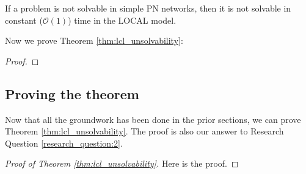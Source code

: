 \begin{lemma} \label{lem:lcl_unsolvability:5}
    If a problem is not solvable in simple PN networks, then it is not solvable in constant ($\mathcal{O}(1)$) time in the LOCAL model.
\end{lemma}

Now we prove Theorem \ref{thm:lcl_unsolvability}:
\begin{proof}
\end{proof}


\subsection{Proving the theorem} \label{sec:algorithm:prooving_the_theorem}
Now that all the groundwork has been done in the prior sections, we can prove Theorem \ref{thm:lcl_unsolvability}.
The proof is also our answer to Research Question \ref{research_question:2}.
\begin{proof}[Proof of Theorem \ref{thm:lcl_unsolvability}]
    Here is the proof.
    \todo{}
\end{proof}


